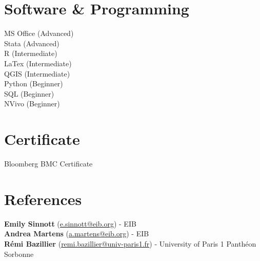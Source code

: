 \documentclass[a4paper,10pt, sidebarwidth=0.4\paperwidth, sidecolor=gray!50]{article}
\begin{document}
\begin{minipage}{.2\linewidth}
\begin{flushleft}
\section{\normalsize{Software \& Programming}}
\smallskip
\small
\color{black}
MS Office (Advanced) \\
\smallskip
Stata (Advanced)\\
\smallskip
R (Intermediate)\\
\smallskip
LaTex (Intermediate)\\
\smallskip
QGIS (Intermediate) \\
\smallskip
Python (Beginner)\\
\smallskip
SQL (Beginner) \\
\smallskip
NVivo (Beginner)\\
\smallskip
\color{blue}\section{\normalsize{Certificate}}
\smallskip
\color{black}
\small Bloomberg BMC Certificate

\color{blue}
\section{\normalsize{References}}
\smallskip
\color{black}
\small \textbf{Emily Sinnott} (\href{mailto:e.sinnott@eib.org}{e.sinnott@eib.org}) - EIB\\
\smallskip
\small \textbf{Andrea Martens} (\href{mailto:a.martens@eib.org}{a.martens@eib.org}) - EIB\\
\smallskip
\small \textbf{Rémi Bazillier} (\href{mailto:Remi.Bazillier@univ-paris1.fr}{remi.bazillier@univ-paris1.fr}) - University of Paris 1 Panthéon Sorbonne


\end{flushleft}
\end{minipage}
\hfill
\end{document}

